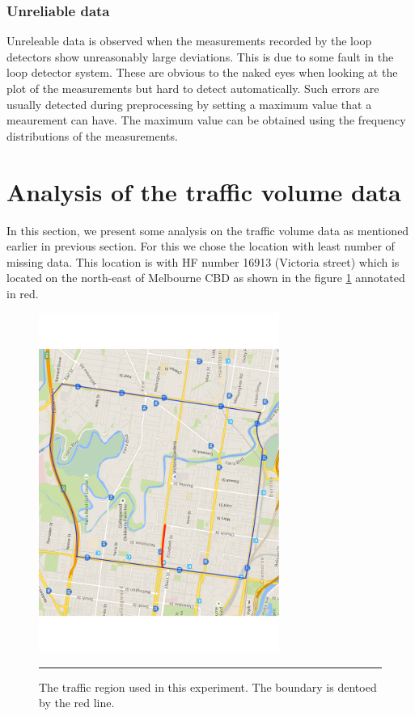 \subsubsection{Unreliable data}
Unreleable data is observed when the measurements recorded by the loop detectors show unreasonably
large deviations. This is due to some fault in the loop detector system. These are obvious to the
naked eyes when looking at the plot of the measurements but hard to detect automatically. Such errors
are usually detected during preprocessing by setting a maximum value that a meaurement can have. The
maximum value can be obtained using the frequency distributions of the measurements.

\section{Analysis of the traffic volume data}

In this section, we present some analysis on the traffic volume data as mentioned earlier in previous
section. For this we chose the location with least number of missing data. This location is with HF
number 16913 (Victoria street) which is located on the north-east of Melbourne CBD as shown in the
figure \ref{fig:ExperimentRegion} annotated in red.

\begin{figure}[htbp]
  \centering
    \includegraphics[width=0.7\textwidth,height=0.7\textheight,keepaspectratio]{Figures/experiment-region.pdf}
    \rule{35em}{0.5pt}
  \caption[Experiment traffic region]{The traffic region used in this experiment. The boundary is
   dentoed by the red line.}
  \label{fig:ExperimentRegion}
\end{figure}



